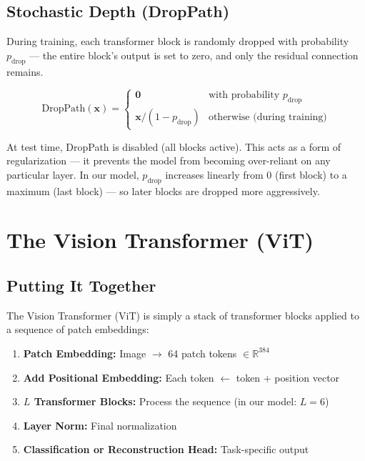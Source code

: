 \documentclass[12pt, a4paper]{report}
\newcommand{\R}{\mathbb{R}}
\newcommand{\vect}[1]{\bm{#1}}
\begin{document}
\section{Stochastic Depth (DropPath)}

During training, each transformer block is randomly dropped with probability $p_{\text{drop}}$ — the entire block's output is set to zero, and only the residual connection remains.

\begin{equation}
\text{DropPath}(\vect{x}) = \begin{cases} \vect{0} & \text{with probability } p_{\text{drop}} \\ \vect{x} / (1 - p_{\text{drop}}) & \text{otherwise (during training)} \end{cases}
\end{equation}

At test time, DropPath is disabled (all blocks active). This acts as a form of regularization — it prevents the model from becoming over-reliant on any particular layer. In our model, $p_{\text{drop}}$ increases linearly from 0 (first block) to a maximum (last block) — so later blocks are dropped more aggressively.

\chapter{The Vision Transformer (ViT)}

\section{Putting It Together}

The Vision Transformer (ViT) is simply a stack of transformer blocks applied to a sequence of patch embeddings:

\begin{enumerate}
    \item \textbf{Patch Embedding:} Image $\to$ 64 patch tokens $\in \R^{384}$
    \item \textbf{Add Positional Embedding:} Each token $\leftarrow$ token + position vector
    \item \textbf{$L$ Transformer Blocks:} Process the sequence (in our model: $L = 6$)
    \item \textbf{Layer Norm:} Final normalization
    \item \textbf{Classification or Reconstruction Head:} Task-specific output
\end{enumerate}
\end{document}
